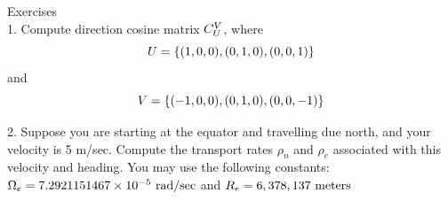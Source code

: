 \begin{frame}
Exercises\\

1.  Compute direction cosine matrix $C_{U}^{V}$, where 
\[U=\left\{(1,0,0),(0,1,0),(0,0,1)\right\}\] 
and \[V=\left\{(-1,0,0),(0,1,0),(0,0,-1)\right\}\]

2. Suppose you are starting at the equator and travelling due north, and your velocity is 5 m/sec.  Compute the transport rates $\rho_n$ and $\rho_e$ associated with this velocity and heading.  You may use the following constants: $\Omega_e=7.2921151467\times 10^{-5} \text{ rad/sec}$ and $R_e=6,378,137 \text{ meters}$
\end{frame}
